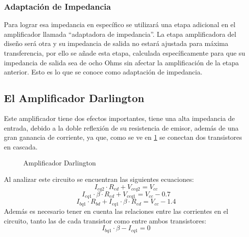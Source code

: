 \subsubsection{Adaptación de Impedancia}

Para lograr esa impedancia en específico se utilizará una etapa adicional en el amplificador llamada “adaptadora de impedancia”. La etapa amplificadora del diseño será otra y su impedancia de salida no estará ajustada para máxima transferencia, por ello se añade esta etapa, calculada específicamente para que su impedancia de salida sea de ocho Ohms sin afectar la amplificación de la etapa anterior. Esto es lo que se conoce como adaptación de impedancia.

\subsection{El Amplificador Darlington}

Este amplificador tiene dos efectos importantes, tiene una alta impedancia de entrada, debido a la doble reflexión de su resistencia de emisor, además de una gran ganancia de corriente, ya que, como se ve en \cref{fig:Amplificador_Darlington} se conectan dos transistores en cascada.

\begin{figure}[H]
    \centering
    
    \caption{Amplificador Darlington}
    \label{fig:Amplificador_Darlington}
\end{figure}

Al analizar este circuito se encuentran las siguientes ecuaciones:
    \begin{equation}
    I_{eq2} \cdot R_{ed} + V_{ceq2} = V_{cc}
    \label{MSD}
    \end{equation}
    \begin{equation}
    I_{eq1} \cdot \beta \cdot R_{ed} + V_{ceq1} = V_{cc}-0.7
    \label{MID}
    \end{equation}
    \begin{equation}
    I_{bq1} \cdot R_{bd} + I_{eq1} \cdot \beta \cdot R_{ed} = V_{cc}-1.4
    \label{MED}
    \end{equation}
Además es necesario tener en cuenta las relaciones entre las corrientes en el circuito, tanto las de cada transistor como entre ambos transistores:
    \begin{equation}
    I_{bq1} \cdot \beta - I_{cq1} = 0
    \label{Gain_Q1}
    \end{equation}
    
